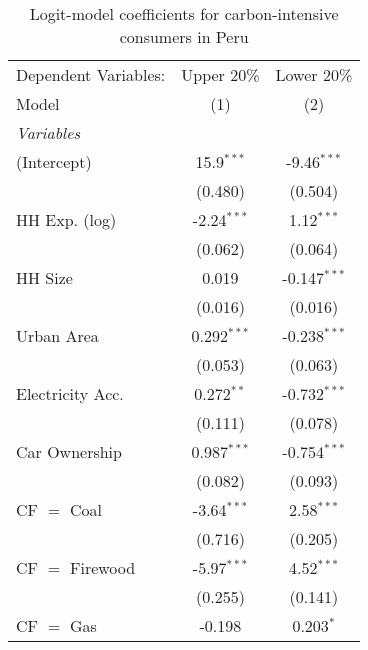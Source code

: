 
\begin{table}[htbp!]
   \centering
   \small
   \begin{adjustbox}{width = 1\textwidth, max height = 0.95\textheight, center}
      \begin{threeparttable}[b]
         \caption{\label{tab:Logit_1_PER} Logit-model coefficients for carbon-intensive consumers in Peru}
         \begin{tabular}{lcc}
            \tabularnewline \midrule \midrule
            Dependent Variables: & Upper 20\%    & Lower 20\%\\   
            Model                & (1)           & (2)\\  
            \midrule
            \emph{Variables}\\
            (Intercept)          & 15.9$^{***}$  & -9.46$^{***}$\\   
                                 & (0.480)       & (0.504)\\   
            HH Exp. (log)        & -2.24$^{***}$ & 1.12$^{***}$\\   
                                 & (0.062)       & (0.064)\\   
            HH Size              & 0.019         & -0.147$^{***}$\\   
                                 & (0.016)       & (0.016)\\   
            Urban Area           & 0.292$^{***}$ & -0.238$^{***}$\\   
                                 & (0.053)       & (0.063)\\   
            Electricity Acc.     & 0.272$^{**}$  & -0.732$^{***}$\\   
                                 & (0.111)       & (0.078)\\   
            Car Ownership        & 0.987$^{***}$ & -0.754$^{***}$\\   
                                 & (0.082)       & (0.093)\\   
            CF $=$ Coal          & -3.64$^{***}$ & 2.58$^{***}$\\   
                                 & (0.716)       & (0.205)\\   
            CF $=$ Firewood      & -5.97$^{***}$ & 4.52$^{***}$\\   
                                 & (0.255)       & (0.141)\\   
            CF $=$ Gas           & -0.198        & 0.203$^{*}$\\   

\end{tabular}
\end{threeparttable}
\end{adjustbox}
\end{table}
